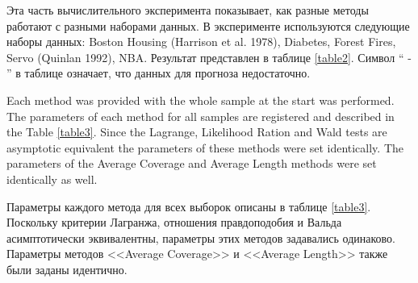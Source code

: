 Эта часть вычислительного эксперимента показывает, как разные методы работают с разными наборами данных. В эксперименте используются следующие наборы данных: Boston Housing (Harrison et al. 1978), Diabetes, Forest Fires, Servo (Quinlan 1992), NBA.
Результат представлен в таблице \ref{table2}. Символ `` - '' в таблице означает, что данных для прогноза недостаточно.

Each method was provided with the whole sample at the start was performed. The parameters of each method for all samples are registered and described in the Table \ref{table3}. Since the Lagrange, Likelihood Ration and Wald tests are asymptotic equivalent the parameters of these methods were set identically. The parameters of the Average Coverage and Average Length methods were set identically as well.

Параметры каждого метода для всех выборок описаны в таблице \ref{table3}. Поскольку критерии Лагранжа, отношения правдоподобия и Вальда асимптотически эквивалентны, параметры этих методов задавались одинаково. Параметры методов <<Average Coverage>> и <<Average Length>> также были заданы идентично.

\begin{table}[h!]
\begin{center}
\caption{Экспертные оценки гиперпараметров для разных методов оценки объема выборки}
\label{table3}
\end{center}
\end{table}

